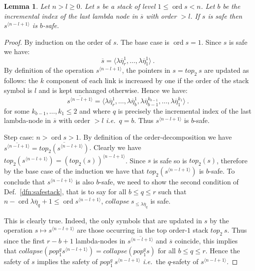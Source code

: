 \documentclass{article}
\newcommand{\ord}{\mathop{\mathrm{ord}}}
\newcommand{\prefixof}{\leqslant}
\newtheorem{lemma}{Lemma}[section]
\theoremstyle{remark}
\theoremstyle{definition}
\newcommand\orddec\overline
\def\ie{{\it i.e.}\ }
\begin{document}
\begin{lemma}
\label{lem:incrk_qsafe}
Let $n>l\geq 0$. Let $s$ be a stack of level $1\leq \ord{s} <n$.
 Let $b$ be the incremental index of the last lambda node in $\orddec{s}$
 with order $>l$.
If $s$ is safe then $s^{\langle n-l+1 \rangle}$ is $b$-safe.
\end{lemma}
\begin{proof}
  By induction on the order of $s$.
The base case is $\ord{s} = 1$.
Since $s$ is safe we have:
\begin{equation}
 \orddec{s} = \langle \lambda \overline{\eta}_r^1
, \ldots, \lambda \overline{\eta}_1^1   \rangle \ . \label{eqn:orddec_s}
\end{equation}
By definition of the operation $s^{\langle n-l+1 \rangle}$, the pointers in $s = top_2\ s$ are updated as follows:
the $k$ component of each link is increased by one if the order of
the stack symbol is $l$ and is kept unchanged otherwise.
Hence we have:
\begin{equation}
\orddec{s^{\langle n-l+1 \rangle}} = \langle
\lambda \overline{\eta}_r^1, \ldots,  \lambda \overline{\eta}_{b}^1, \lambda \overline{\eta}_{b-1}^{k_{b-1}}, \ldots,
 \lambda \overline{\eta}_1^{k_1} \rangle
\ .
\end{equation}
for some $k_{b-1}, \ldots , k_1 \leq 2$ and where $q$ is precisely the incremental index of the last lambda-node in $\orddec{s}$ with order $>l$ \ie $q=b$. Thus $s^{\langle n-l+1 \rangle}$ is $b$-safe.

Step case: $n>\ord{s}>1$.
By definition of the order-decomposition we have
$\orddec{s^{\langle n-l+1 \rangle}} = \orddec{top_2 (s^{\langle n-l+1 \rangle})}$.
Clearly we have $top_2 (s^{\langle n-l+1 \rangle}) = (top_2 (s))^{\langle n-l+1 \rangle}$.
Since $s$ is safe so is $top_2(s)$, therefore by the base case of the induction we have that $top_2 (s^{\langle n-l+1 \rangle})$ is $b$-safe. To conclude that $s^{\langle n-l+1 \rangle}$ is also $b$-safe, we need to show the second condition of Def.~\ref{dfn:safestack},
that is to say for all $b\leq q \leq r$ such that
$n-\ord{\lambda \overline{\eta}_{q}} +1 \leq \ord{s^{\langle n-l+1 \rangle}}$, $collapse~s_{\prefixof \lambda \overline{\eta}_{q}}$ is safe.

This is clearly true. Indeed, the only symbols that are updated in $s$ by the operation $s \mapsto s^{\langle n-l+1 \rangle}$ are those occurring in the top order-$1$ stack $top_2~s$. Thus since the first $r-b+1$ lambda-nodes in $\orddec{s^{\langle n-l+1 \rangle}}$ and $\orddec{s}$ coincide, this implies that $collapse(pop_1^{q} s^{\langle n-l+1 \rangle}) = collapse(pop_1^q s)$ for all $b \leq q \leq r$.
Hence the safety of $s$ implies the safety of $pop_1^{q}~s^{\langle n-l+1 \rangle}$ \ie the $q$-safety of $s^{\langle n-l+1 \rangle}$.
\end{proof}
\end{document}
